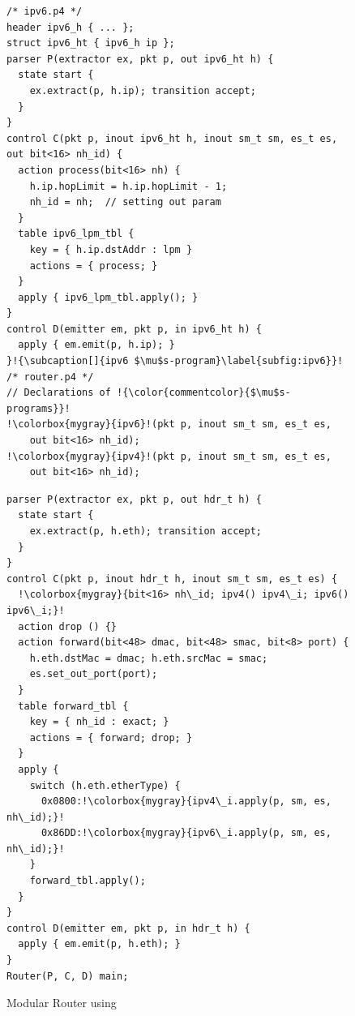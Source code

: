\documentclass[letterpaper,twocolumn,10pt]{article}
\begin{document}



\begin{figure}[!ht]
\noindent \begin{minipage}[t]{.50\textwidth}
\begin{lstlisting}[frame=none, escapechar=!]
/* ipv6.p4 */
header ipv6_h { ... }; 
struct ipv6_ht { ipv6_h ip };
parser P(extractor ex, pkt p, out ipv6_ht h) {
  state start {
    ex.extract(p, h.ip); transition accept;
  }
}
control C(pkt p, inout ipv6_ht h, inout sm_t sm, es_t es, out bit<16> nh_id) {
  action process(bit<16> nh) {
    h.ip.hopLimit = h.ip.hopLimit - 1;
    nh_id = nh;  // setting out param
  }
  table ipv6_lpm_tbl {
    key = { h.ip.dstAddr : lpm }
    actions = { process; }
  }
  apply { ipv6_lpm_tbl.apply(); }
}
control D(emitter em, pkt p, in ipv6_ht h) {
  apply { em.emit(p, h.ip); }
}!{\subcaption[]{ipv6 $\mu$s-program}\label{subfig:ipv6}}!
/* router.p4 */
// Declarations of !{\color{commentcolor}{$\mu$s-programs}}!
!\colorbox{mygray}{ipv6}!(pkt p, inout sm_t sm, es_t es, 
    out bit<16> nh_id);
!\colorbox{mygray}{ipv4}!(pkt p, inout sm_t sm, es_t es, 
    out bit<16> nh_id);
\end{lstlisting}%
\end{minipage}\hspace{-4pt}\vline
\hfill\begin{minipage}[t]{.50\textwidth}
\begin{lstlisting}[frame=none, escapechar=!]
parser P(extractor ex, pkt p, out hdr_t h) {
  state start {
    ex.extract(p, h.eth); transition accept;
  }
}
control C(pkt p, inout hdr_t h, inout sm_t sm, es_t es) {
  !\colorbox{mygray}{bit<16> nh\_id; ipv4() ipv4\_i; ipv6() ipv6\_i;}!
  action drop () {}           
  action forward(bit<48> dmac, bit<48> smac, bit<8> port) {
    h.eth.dstMac = dmac; h.eth.srcMac = smac;
    es.set_out_port(port);
  }
  table forward_tbl {
    key = { nh_id : exact; } 
    actions = { forward; drop; }
  }
  apply {
    switch (h.eth.etherType) {
      0x0800:!\colorbox{mygray}{ipv4\_i.apply(p, sm, es, nh\_id);}!
      0x86DD:!\colorbox{mygray}{ipv6\_i.apply(p, sm, es, nh\_id);}!
    }
    forward_tbl.apply(); 
  }
}
control D(emitter em, pkt p, in hdr_t h) {
  apply { em.emit(p, h.eth); }
}
Router(P, C, D) main;
\end{lstlisting}
\label{subfig:router-main}
\end{minipage}
\caption[]{Modular Router using \uarch \footnotemark}
\label{fig:modular-router}
\end{figure}
\end{document}
